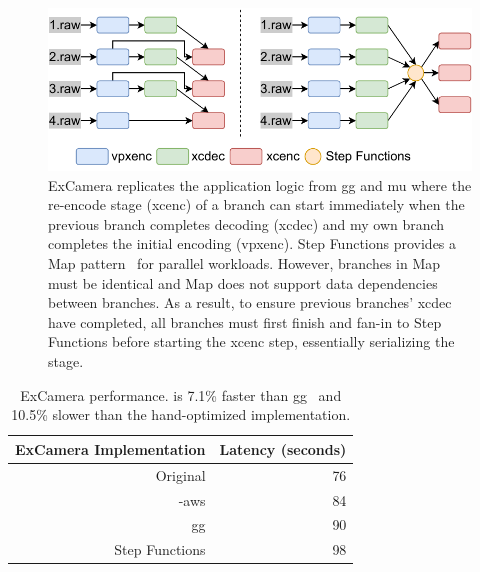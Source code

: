 \begin{figure}[t!]
    \centering
    \includegraphics[width=\columnwidth]{figures/ExCameraPattern.pdf}
    \caption{\name{} ExCamera replicates the application logic from gg and mu
     where the re-encode stage (xcenc) of a branch can start immediately when
     the previous branch completes decoding (xcdec) and my own branch
     completes the initial encoding (vpxenc). Step Functions provides a Map
     pattern~\cite{aws-step-functions-map-state} for parallel workloads.
     However, branches in Map must be identical and Map does not support data
     dependencies between branches. As a result, to ensure previous branches'
     xcdec have completed, all branches must first finish and fan-in to Step
     Functions before starting the xcenc step, essentially serializing the
     stage.}
    \label{fig:excamera-pattern}
\end{figure}

\begin{table}
  \centering
  \begin{tabular}{|r|r|}
    \hline
    \textbf{ExCamera Implementation} & \textbf{Latency (seconds)} \\ \hline
    Original        & 76                         \\ \hline
    \name{}-aws & 84                         \\ \hline
    gg                       & 90                         \\ \hline
    Step Functions & 98                         \\ \hline
  \end{tabular}
  \caption{ExCamera performance. \name{} is 7.1\% faster than
gg~\cite{gg-atc} and 10.5\% slower than the hand-optimized implementation.}
  \label{table:excamera}
\end{table}